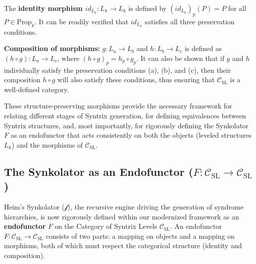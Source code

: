 \documentclass[
    12pt,              %
    a4paper,           %
    headings=normal,   %
    twoside=true,      %
    BCOR=8mm,          %
]{scrbook}
\newcommand{\synkolator}{\mathcal{f}}
\begin{document}
The \textbf{identity morphism \(id_{L_k}: L_k \to L_k\)} is defined by \((id_{L_k})_p(P) = P\) for all \(P \in \text{Prop}_k\). It can be readily verified that \(id_{L_k}\) satisfies all three preservation conditions.

\textbf{Composition of morphisms:} \(g: L_a \to L_b\) and \(h: L_b \to L_c\) is defined as \( (h \circ g): L_a \to L_c \), where \( (h \circ g)_p = h_p \circ g_p \). It can also be shown that if \(g\) and \(h\) individually satisfy the preservation conditions (a), (b), and (c), then their composition \(h \circ g\) will also satisfy these conditions, thus ensuring that \(\mathcal{C}_{\text{SL}}\) is a well-defined category.

These structure-preserving morphisms provide the necessary framework for relating different stages of Syntrix generation, for defining equivalences between Syntrix structures, and, most importantly, for rigorously defining the Synkolator \(F\) as an endofunctor that acts consistently on both the objects (leveled structures \(L_k\)) and the morphisms of \(\mathcal{C}_{\text{SL}}\).

\subsection{The Synkolator as an Endofunctor (\(F: \mathcal{C}_{\text{SL}} \to \mathcal{C}_{\text{SL}}\))}
\label{sec:ch2_synkolator_as_functor} 

Heim’s Synkolator (\(\synkolator\)), the recursive engine driving the generation of syndrome hierarchies, is now rigorously defined within our modernized framework as an \textbf{endofunctor} \(F\) on the Category of Syntrix Levels \(\mathcal{C}_{\text{SL}}\). An endofunctor \(F: \mathcal{C}_{\text{SL}} \to \mathcal{C}_{\text{SL}}\) consists of two parts: a mapping on objects and a mapping on morphisms, both of which must respect the categorical structure (identity and composition).
\end{document}
